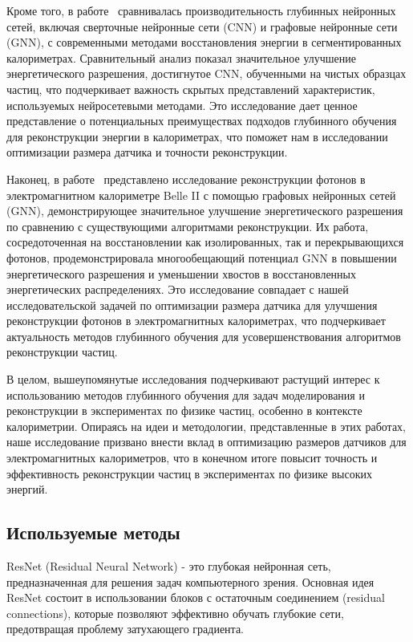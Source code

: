 \documentclass[a4paper,12pt]{extarticle}
\begin{document}
Кроме того, в работе~\cite{Akchurin_2021} сравнивалась производительность глубинных нейронных сетей, включая сверточные нейронные сети (CNN) и графовые нейронные сети (GNN), с современными методами восстановления энергии в сегментированных калориметрах. Сравнительный анализ показал значительное улучшение энергетического разрешения, достигнутое CNN, обученными на чистых образцах частиц, что подчеркивает важность скрытых представлений характеристик, используемых нейросетевыми методами. Это исследование дает ценное представление о потенциальных преимуществах подходов глубинного обучения для реконструкции энергии в калориметрах, что поможет нам в исследовании оптимизации размера датчика и точности реконструкции.

Наконец, в работе~\cite{Wemmer_2023} представлено исследование реконструкции фотонов в электромагнитном калориметре Belle II с помощью графовых нейронных сетей (GNN), демонстрирующее значительное улучшение энергетического разрешения по сравнению с существующими алгоритмами реконструкции. Их работа, сосредоточенная на восстановлении как изолированных, так и перекрывающихся фотонов, продемонстрировала многообещающий потенциал GNN в повышении энергетического разрешения и уменьшении хвостов в восстановленных энергетических распределениях. Это исследование совпадает с нашей исследовательской задачей по оптимизации размера датчика для улучшения реконструкции фотонов в электромагнитных калориметрах, что подчеркивает актуальность методов глубинного обучения для усовершенствования алгоритмов реконструкции частиц.

В целом, вышеупомянутые исследования подчеркивают растущий интерес к использованию методов глубинного обучения для задач моделирования и реконструкции в экспериментах по физике частиц, особенно в контексте калориметрии. Опираясь на идеи и методологии, представленные в этих работах, наше исследование призвано внести вклад в оптимизацию размеров датчиков для электромагнитных калориметров, что в конечном итоге повысит точность и эффективность реконструкции частиц в экспериментах по физике высоких энергий.

\subsection{Используемые методы}
\label{subsection:used_methods}

ResNet (Residual Neural Network) - это глубокая нейронная сеть, предназначенная для решения задач компьютерного зрения. Основная идея ResNet состоит в использовании блоков с остаточным соединением (residual connections), которые позволяют эффективно обучать глубокие сети, предотвращая проблему затухающего градиента.
\end{document}
